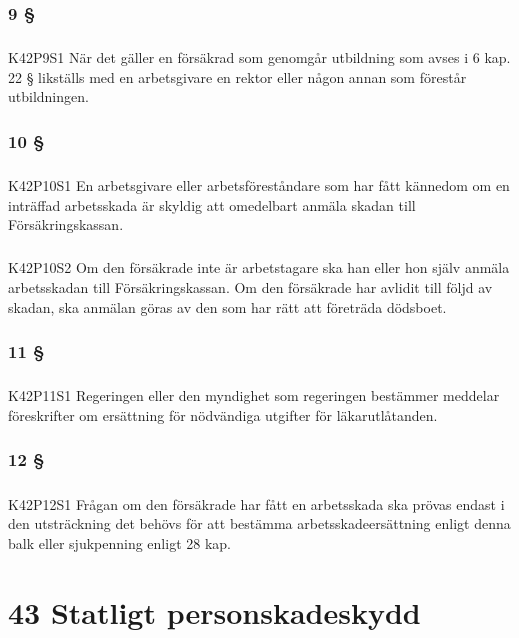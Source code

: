 \documentclass[a4paper,notitlepage,openany,10pt]{book}
\begin{document}
\subsection*{9 §}
\paragraph*{}
{\tiny K42P9S1}
När det gäller en försäkrad som genomgår utbildning som avses i 6 kap. 22 § likställs med en arbetsgivare en rektor eller någon annan som förestår utbildningen.
\subsection*{10 §}
\paragraph*{}
{\tiny K42P10S1}
En arbetsgivare eller arbetsföreståndare som har fått kännedom om en inträffad arbetsskada är skyldig att omedelbart anmäla skadan till Försäkringskassan.
\paragraph*{}
{\tiny K42P10S2}
Om den försäkrade inte är arbetstagare ska han eller hon själv anmäla arbetsskadan till Försäkringskassan. Om den försäkrade har avlidit till följd av skadan, ska anmälan göras av den som har rätt att företräda dödsboet.
\subsection*{11 §}
\paragraph*{}
{\tiny K42P11S1}
Regeringen eller den myndighet som regeringen bestämmer meddelar föreskrifter om ersättning för nödvändiga utgifter för läkarutlåtanden.
\subsection*{12 §}
\paragraph*{}
{\tiny K42P12S1}
Frågan om den försäkrade har fått en arbetsskada ska prövas endast i den utsträckning det behövs för att bestämma arbetsskadeersättning enligt denna balk eller sjukpenning enligt 28 kap.
\chapter*{43 Statligt personskadeskydd}
\end{document}

